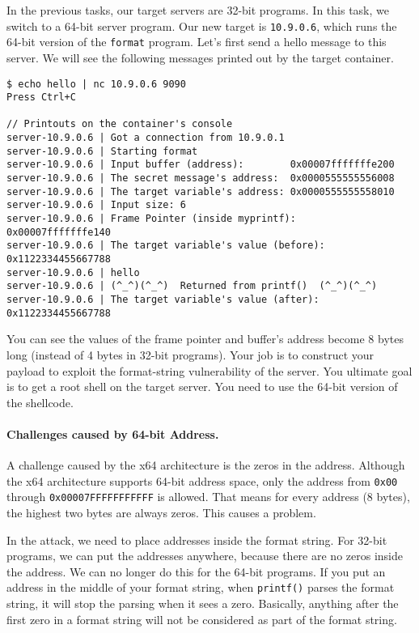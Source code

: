In the previous tasks, our target servers are 32-bit
programs. In this task, we switch to a 64-bit server
program.  Our new target is \texttt{10.9.0.6}, which
runs the 64-bit version of the \texttt{format} program.
Let's first send a hello message to this server.
We will see the following messages printed out by the target container.


\begin{lstlisting}
$ echo hello | nc 10.9.0.6 9090
Press Ctrl+C

// Printouts on the container's console
server-10.9.0.6 | Got a connection from 10.9.0.1
server-10.9.0.6 | Starting format
server-10.9.0.6 | Input buffer (address):        0x00007fffffffe200
server-10.9.0.6 | The secret message's address:  0x0000555555556008
server-10.9.0.6 | The target variable's address: 0x0000555555558010
server-10.9.0.6 | Input size: 6
server-10.9.0.6 | Frame Pointer (inside myprintf):      0x00007fffffffe140
server-10.9.0.6 | The target variable's value (before): 0x1122334455667788
server-10.9.0.6 | hello
server-10.9.0.6 | (^_^)(^_^)  Returned from printf()  (^_^)(^_^)
server-10.9.0.6 | The target variable's value (after):  0x1122334455667788
\end{lstlisting}
 

You can see the values of the frame pointer and buffer's address
become 8 bytes long (instead of 4 bytes in 32-bit programs).
Your job is to construct your payload to exploit the format-string 
vulnerability of the server.
You ultimate goal is to get a root shell on
the target server. You need to use the 64-bit version of the shellcode.


\paragraph{Challenges caused by 64-bit Address.}
A challenge caused by the x64 architecture is the zeros in the address.
Although the x64 architecture
supports 64-bit address space, only the address from
\texttt{0x00} through \texttt{0x00007FFFFFFFFFFF} is allowed. That means for
every address (8 bytes), the highest two bytes are always zeros.
This causes a problem.

In the attack, we need to place addresses inside the format string. For
32-bit programs, we can put the addresses anywhere, because there
are no zeros inside the address. We can no longer do this
for the 64-bit programs. If you put an address in the middle of
your format string, when \texttt{printf()} parses the
format string, it will stop the parsing when it sees a zero. Basically,
anything after the first zero in a format string will not
be considered as part of the format string.

